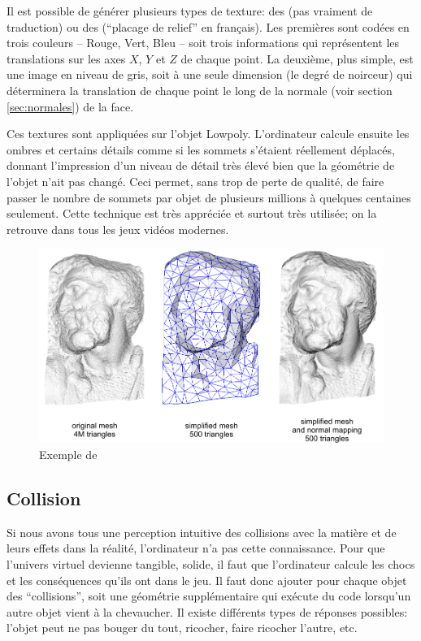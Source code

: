 Il est possible de générer plusieurs types de texture: des  (pas vraiment de traduction) ou des  (\enquote{placage de relief} en français). Les premières sont codées en trois couleurs -- Rouge, Vert, Bleu -- soit trois informations qui représentent les translations sur les axes $X$, $Y$ et $Z$ de chaque point. La deuxième, plus simple, est une image en niveau de gris, soit à une seule dimension (le degré de noirceur) qui déterminera la translation de chaque point le long de la normale (voir section \ref{sec:normales}) de la face.

Ces textures sont appliquées sur l'objet Lowpoly. L'ordinateur calcule ensuite les ombres et certains détails comme si les sommets s'étaient réellement déplacés, donnant l'impression d'un niveau de détail très élevé bien que la géométrie de l'objet n'ait pas changé. Ceci permet, sans trop de perte de qualité, de faire passer le nombre de sommets par objet de plusieurs millions à quelques centaines seulement. Cette technique est très appréciée et surtout très utilisée; on la retrouve dans tous les jeux vidéos modernes.

\begin{figure}[th!]
	\center
	\includegraphics[width=.8\textwidth]{images/Technique/Normal_map_example.png}
	\caption{Exemple de  {\cite{Normalmappingusedtoredetailsimplifiedmeshes_}}}
\end{figure}


\subsection{Collision}
\label{sec:collisions}
Si nous avons tous une perception intuitive des collisions avec la matière et de leurs effets dans la réalité, l'ordinateur n'a pas cette connaissance. Pour que l'univers virtuel devienne tangible, solide, il faut que l'ordinateur calcule les chocs et les conséquences qu'ils ont dans le jeu. Il faut donc ajouter pour chaque objet des \enquote{collisions}, soit une géométrie supplémentaire qui exécute du code lorsqu'un autre objet vient à la chevaucher. Il existe différents types de réponses possibles: l'objet peut ne pas bouger du tout, ricocher, faire ricocher l'autre, etc.

